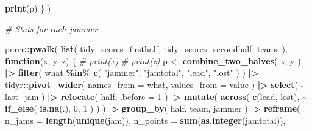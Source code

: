\documentclass[
]{article}
\newenvironment{Shaded}{\begin{snugshade}}{\end{snugshade}}
\newcommand{\AttributeTok}[1]{\textcolor[rgb]{0.13,0.29,0.53}{#1}}
\newcommand{\CommentTok}[1]{\textcolor[rgb]{0.56,0.35,0.01}{\textit{#1}}}
\newcommand{\ControlFlowTok}[1]{\textcolor[rgb]{0.13,0.29,0.53}{\textbf{#1}}}
\newcommand{\DecValTok}[1]{\textcolor[rgb]{0.00,0.00,0.81}{#1}}
\newcommand{\FunctionTok}[1]{\textcolor[rgb]{0.13,0.29,0.53}{\textbf{#1}}}
\newcommand{\NormalTok}[1]{#1}
\newcommand{\OtherTok}[1]{\textcolor[rgb]{0.56,0.35,0.01}{#1}}
\newcommand{\SpecialCharTok}[1]{\textcolor[rgb]{0.81,0.36,0.00}{\textbf{#1}}}
\newcommand{\StringTok}[1]{\textcolor[rgb]{0.31,0.60,0.02}{#1}}
\begin{document}
\begin{Shaded}
\begin{Highlighting}[]
    \FunctionTok{print}\NormalTok{(p)}
\NormalTok{  \}}
\NormalTok{)}

\CommentTok{\# Stats for each jammer {-}{-}{-}{-}{-}{-}{-}{-}{-}{-}{-}{-}{-}{-}{-}{-}{-}{-}{-}{-}{-}{-}{-}{-}{-}{-}{-}{-}{-}{-}{-}{-}{-}{-}{-}{-}{-}{-}{-}{-}{-}{-}{-}{-}{-}{-}{-}{-}{-}{-}{-}}

\NormalTok{purrr}\SpecialCharTok{::}\FunctionTok{pwalk}\NormalTok{(}
  \FunctionTok{list}\NormalTok{(}
\NormalTok{    tidy\_scores\_firsthalf,}
\NormalTok{    tidy\_scores\_secondhalf,}
\NormalTok{    teams}
\NormalTok{  ),}
  \ControlFlowTok{function}\NormalTok{(x, y, z) \{}
    \CommentTok{\# print(x)}
    \CommentTok{\# print(z)}
\NormalTok{    p }\OtherTok{\textless{}{-}} \FunctionTok{combine\_two\_halves}\NormalTok{(}
\NormalTok{      x, y}
\NormalTok{    ) }\SpecialCharTok{|\textgreater{}}
      \FunctionTok{filter}\NormalTok{(}
\NormalTok{        what }\SpecialCharTok{\%in\%} \FunctionTok{c}\NormalTok{(}
          \StringTok{"jammer"}\NormalTok{,}
          \StringTok{"jamtotal"}\NormalTok{,}
          \StringTok{"lead"}\NormalTok{,}
          \StringTok{"lost"}
\NormalTok{        )}
\NormalTok{      ) }\SpecialCharTok{|\textgreater{}}
\NormalTok{      tidyr}\SpecialCharTok{::}\FunctionTok{pivot\_wider}\NormalTok{(}
        \AttributeTok{names\_from =}\NormalTok{ what,}
        \AttributeTok{values\_from =}\NormalTok{ value}
\NormalTok{      ) }\SpecialCharTok{|\textgreater{}}
      \FunctionTok{select}\NormalTok{(}
        \SpecialCharTok{{-}}\NormalTok{ last\_jam}
\NormalTok{      ) }\SpecialCharTok{|\textgreater{}}
      \FunctionTok{relocate}\NormalTok{(}
\NormalTok{        half,}
        \AttributeTok{.before =} \DecValTok{1}
\NormalTok{      ) }\SpecialCharTok{|\textgreater{}}
      \FunctionTok{mutate}\NormalTok{(}
        \FunctionTok{across}\NormalTok{(}
          \FunctionTok{c}\NormalTok{(lead, lost),}
          \SpecialCharTok{\textasciitilde{}} \FunctionTok{if\_else}\NormalTok{(}
            \FunctionTok{is.na}\NormalTok{(.),}
            \DecValTok{0}\NormalTok{,}
            \DecValTok{1}
\NormalTok{          )}
\NormalTok{        )}
\NormalTok{      ) }\SpecialCharTok{|\textgreater{}}
      \FunctionTok{group\_by}\NormalTok{(}
\NormalTok{        half,}
\NormalTok{        team,}
\NormalTok{        jammer}
\NormalTok{      ) }\SpecialCharTok{|\textgreater{}}
      \FunctionTok{reframe}\NormalTok{(}
        \AttributeTok{n\_jams =} \FunctionTok{length}\NormalTok{(}\FunctionTok{unique}\NormalTok{(jam)),}
        \AttributeTok{n\_points =} \FunctionTok{sum}\NormalTok{(}\FunctionTok{as.integer}\NormalTok{(jamtotal)),}

\end{Highlighting}
\end{Shaded}
\end{document}
